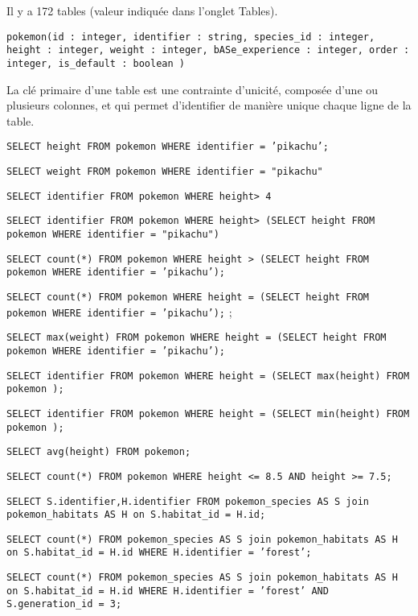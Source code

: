 \question{}
Il y a 172 tables (valeur indiquée dans l'onglet Tables).

\question{}
\texttt{pokemon(id : integer, identifier : string, species\_id : integer, height : integer, weight : integer, bASe\_experience : integer, order : integer, is\_default : boolean )} 

\question{}
La clé primaire d'une table est une contrainte d'unicité, composée d'une ou plusieurs colonnes, et qui permet d'identifier de manière unique chaque ligne de la table.

%

\question{}
\texttt{SELECT height FROM pokemon WHERE identifier = 'pikachu';}  

\question{}
\texttt{SELECT weight FROM pokemon WHERE identifier = "pikachu"}  


\question{}
\texttt{SELECT identifier FROM pokemon WHERE height> 4}

\question{}
\texttt{SELECT identifier FROM pokemon WHERE height> (SELECT height FROM pokemon WHERE identifier = "pikachu")}


\question{}
\texttt{SELECT count(*) FROM pokemon WHERE height > (SELECT height FROM pokemon WHERE identifier = 'pikachu');}  

\question{}
\texttt{SELECT count(*) FROM pokemon WHERE height = (SELECT height FROM pokemon WHERE identifier = 'pikachu');}  ;

\texttt{SELECT max(weight) FROM pokemon WHERE height = (SELECT height FROM pokemon WHERE identifier = 'pikachu');} 

\question{}
\texttt{SELECT identifier FROM pokemon WHERE height = (SELECT max(height) FROM pokemon );} 

\texttt{SELECT identifier FROM pokemon WHERE height = (SELECT min(height) FROM pokemon );}  

\question{}
\texttt{SELECT avg(height) FROM pokemon;} 


\question{}
 \texttt{SELECT count(*) FROM pokemon WHERE height <= 8.5 AND height >= 7.5;}  

\question{}
\texttt{SELECT S.identifier,H.identifier FROM pokemon\_species AS S join pokemon\_habitats AS H on S.habitat\_id = H.id;}

\question{}
\texttt{SELECT count(*) FROM pokemon\_species AS S join pokemon\_habitats AS H on S.habitat\_id = H.id WHERE H.identifier = 'forest';}   


\question{}
\texttt{SELECT count(*) FROM pokemon\_species AS S join pokemon\_habitats AS H on S.habitat\_id = H.id WHERE H.identifier = 'forest' AND S.generation\_id = 3;} 


